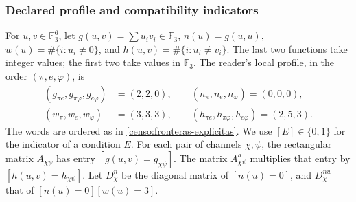 \subsubsection{Declared profile and compatibility indicators}

For \(u,v\in\mathbb F_3^6\), let
\(g(u,v)=\sum u_iv_i\in\mathbb F_3\),
\(n(u)=g(u,u)\), \(w(u)=\#\{i:u_i\ne0\}\), and
\(h(u,v)=\#\{i:u_i\ne v_i\}\). The last two functions take
integer values; the first two take values in \(\mathbb F_3\).
The reader's local profile, in the order \((\pi,e,\varphi)\), is
\begin{equation}
 \begin{split}
 (g_{\pi e},g_{\pi\varphi},g_{e\varphi})&=(2,2,0),\qquad
 (n_\pi,n_e,n_\varphi)=(0,0,0),\\
 (w_\pi,w_e,w_\varphi)&=(3,3,3),\qquad
 (h_{\pi e},h_{\pi\varphi},h_{e\varphi})=(2,5,3).
 \end{split}
 \label{censo:perfil-local}
\end{equation}
The words are ordered as in \eqref{censo:fronteras-explicitas}.
We use \([E]\in\{0,1\}\) for the indicator of a condition \(E\).
For each pair of channels \(\chi,\psi\), the rectangular matrix
\(A_{\chi\psi}\) has entry \([g(u,v)=g_{\chi\psi}]\).
The matrix \(A^{h}_{\chi\psi}\) multiplies that entry by
\([h(u,v)=h_{\chi\psi}]\). Let \(D_\chi^n\) be the diagonal matrix
of \([n(u)=0]\), and \(D_\chi^{nw}\) that of
\([n(u)=0][w(u)=3]\).

